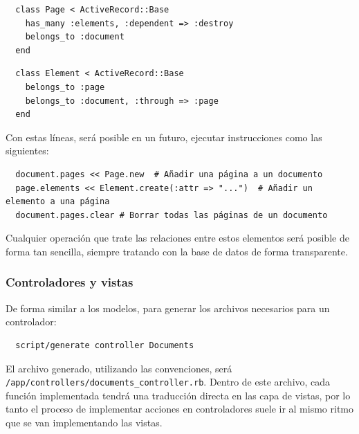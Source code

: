 \begin{verbatim}
  class Page < ActiveRecord::Base
    has_many :elements, :dependent => :destroy
    belongs_to :document
  end
\end{verbatim}

\begin{verbatim}
  class Element < ActiveRecord::Base
    belongs_to :page
    belongs_to :document, :through => :page
  end
\end{verbatim}


Con estas líneas, será posible en un futuro, ejecutar instrucciones como las siguientes:

\begin{verbatim}
  document.pages << Page.new  # Añadir una página a un documento
  page.elements << Element.create(:attr => "...")  # Añadir un elemento a una página
  document.pages.clear # Borrar todas las páginas de un documento
\end{verbatim}

Cualquier operación que trate las relaciones entre estos elementos será posible de forma tan sencilla, siempre tratando con la base de datos de forma transparente. 


\subsubsection{Controladores y vistas} %
\label{ssub:controlador}

De forma similar a los modelos, para generar los archivos necesarios para un controlador:

\begin{verbatim}
  script/generate controller Documents
\end{verbatim}

El archivo generado, utilizando las convenciones, será \texttt{/app/controllers/documents\_controller.rb}. Dentro de este archivo, cada función implementada tendrá una traducción directa en las capa de vistas, por lo tanto el proceso de implementar acciones en controladores suele ir al mismo ritmo que se van implementando las vistas.

